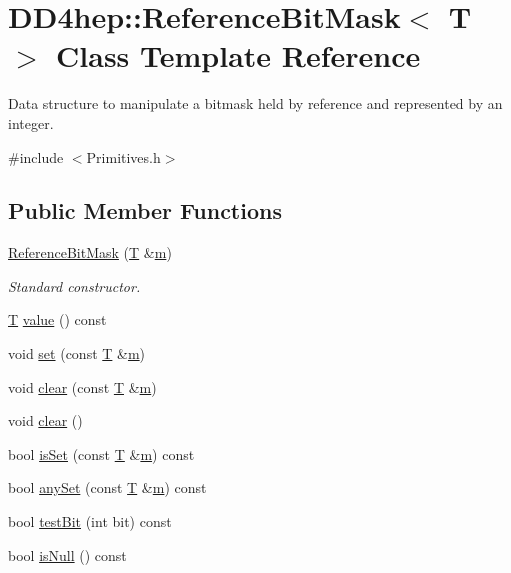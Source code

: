 \hypertarget{class_d_d4hep_1_1_reference_bit_mask}{}\section{D\+D4hep\+:\+:Reference\+Bit\+Mask$<$ T $>$ Class Template Reference}
\label{class_d_d4hep_1_1_reference_bit_mask}


Data structure to manipulate a bitmask held by reference and represented by an integer.  




{\ttfamily \#include $<$Primitives.\+h$>$}

\subsection*{Public Member Functions}
\begin{DoxyCompactItemize}
\item 
\hyperlink{class_d_d4hep_1_1_reference_bit_mask_abd3539ce53a7879da72da52fadb2b829}{Reference\+Bit\+Mask} (\hyperlink{class_t}{T} \&\hyperlink{_volumes_8cpp_a6fc379aaec47ce424b00d8ffda2a6c59}{m})
\begin{DoxyCompactList}\small\item\em Standard constructor. \end{DoxyCompactList}\item 
\hyperlink{class_t}{T} \hyperlink{class_d_d4hep_1_1_reference_bit_mask_ae0efa1aa20beec300c612de6bb70ff66}{value} () const
\item 
void \hyperlink{class_d_d4hep_1_1_reference_bit_mask_a9b0db38e1812101d6d93e1d00944b745}{set} (const \hyperlink{class_t}{T} \&\hyperlink{_volumes_8cpp_a6fc379aaec47ce424b00d8ffda2a6c59}{m})
\item 
void \hyperlink{class_d_d4hep_1_1_reference_bit_mask_a3c384d81d710f444161e1f8cbf9420ae}{clear} (const \hyperlink{class_t}{T} \&\hyperlink{_volumes_8cpp_a6fc379aaec47ce424b00d8ffda2a6c59}{m})
\item 
void \hyperlink{class_d_d4hep_1_1_reference_bit_mask_a22b33d5d302fa4e84c10689f07886517}{clear} ()
\item 
bool \hyperlink{class_d_d4hep_1_1_reference_bit_mask_ad8c944401e10ede63f6291357d2e0fa6}{is\+Set} (const \hyperlink{class_t}{T} \&\hyperlink{_volumes_8cpp_a6fc379aaec47ce424b00d8ffda2a6c59}{m}) const
\item 
bool \hyperlink{class_d_d4hep_1_1_reference_bit_mask_a91802e95b2585e21742521a6734cee44}{any\+Set} (const \hyperlink{class_t}{T} \&\hyperlink{_volumes_8cpp_a6fc379aaec47ce424b00d8ffda2a6c59}{m}) const
\item 
bool \hyperlink{class_d_d4hep_1_1_reference_bit_mask_ae7e89ecd03fec8e012fa4c943a03be2d}{test\+Bit} (int bit) const
\item 
bool \hyperlink{class_d_d4hep_1_1_reference_bit_mask_a5a53ad6f62a0348f608b1a7f33674a67}{is\+Null} () const
\end{DoxyCompactItemize}
